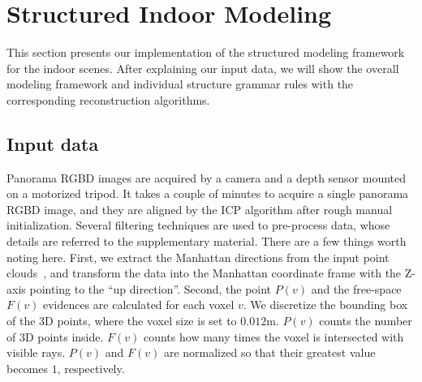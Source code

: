 \section{Structured Indoor Modeling} \label{section:room}

This section presents our implementation of the structured modeling
framework for the indoor scenes.
%
After explaining our input data, we will show the overall modeling framework and individual
structure grammar rules with the corresponding reconstruction
algorithms.

\subsection{Input data}
Panorama RGBD images are acquired by a camera and a depth sensor mounted on a motorized tripod. It takes a couple of minutes to acquire a single panorama RGBD image, and they are aligned by the ICP algorithm after rough manual initialization. Several filtering techniques are used to pre-process data, 
whose details are referred to the supplementary material. There are a few things worth noting here.
First, we extract the Manhattan directions from the input point
clouds~\cite{ManhattanWorldStereo}, and transform the data into the
Manhattan coordinate frame with the Z-axis pointing to the ``up
direction''. Second,
%
%
the point $P(v)$ and the free-space $F(v)$ evidences are calculated for
each voxel $v$.
We discretize the bounding box of the 3D points, where the voxel size is
set to $0.012\mbox{m}$.
$P(v)$ counts the number of 3D points inside. $F(v)$ counts how many
times the voxel is intersected with visible rays. $P(v)$ and $F(v)$ are
normalized so that their greatest value becomes $1$, respectively.

